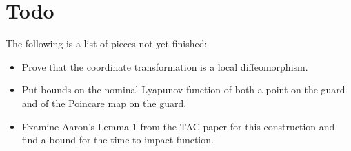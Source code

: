 \documentclass[twocolumn]{article}
\begin{document}
\section*{Todo}
The following is a list of pieces not yet finished:
\begin{itemize}
\item Prove that the coordinate transformation is a local diffeomorphism.
\item Put bounds on the nominal Lyapunov function of both a point on the guard and of the Poincare map on the guard.
\item Examine Aaron's Lemma 1 from the TAC paper for this construction and find a bound for the time-to-impact function.
\end{itemize}
\end{document}
